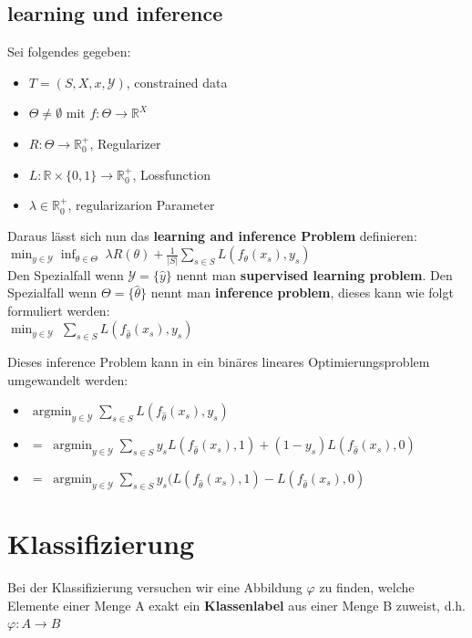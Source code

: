 \documentclass[12pt,a4paper]{article}
\DeclareMathOperator*{\argmin}{argmin}
\newcommand{\nl}{\\[0.1cm]}
\begin{document}
\subsection{learning und inference}
Sei folgendes gegeben:
\begin{itemize}
\item $T=(S,X,x,\mathcal{Y})$, constrained data
\item $\Theta \neq \emptyset$ mit $f: \Theta \rightarrow \mathbb{R}^X$
\item $R: \Theta \rightarrow \mathbb{R}^+_0$, Regularizer
\item $L:\mathbb{R}\times\{0,1\}\rightarrow\mathbb{R}^+_0$, Lossfunction
\item $\lambda\in\mathbb{R}^+_0$, regularizarion Parameter
\end{itemize}
Daraus lässt sich nun das \textbf{learning and inference Problem} definieren:\nl
$\displaystyle \min_{y\in\mathcal{Y}} \inf_{\theta\in\Theta}\; \lambda R(\theta) + \frac{1}{|S|}\sum_{s\in S} L(f_\theta (x_s), y_s)$\nl
Den Spezialfall wenn $\mathcal{Y} = \{\hat{y}\}$ nennt man \textbf{supervised learning problem}. Den Spezialfall wenn $\Theta = \{\hat{\theta}\}$ nennt man \textbf{inference problem}, dieses kann wie folgt formuliert werden:\nl
$\displaystyle \min_{y\in\mathcal{Y}}\; \sum_{s\in S} L(f_{\hat{\theta}} (x_s),y_s)$

Dieses inference Problem kann in ein binäres lineares Optimierungsproblem umgewandelt werden:
\begin{itemize}
\item $\displaystyle \argmin_{y\in\mathcal{Y}} \sum_{s\in S} L(f_{\hat{\theta}} (x_s),y_s)$
\item $\displaystyle = \; \argmin_{y\in\mathcal{Y}} \sum_{s\in S} y_s L(f_{\hat{\theta}} (x_s),1) + (1-y_s) L(f_{\hat{\theta}} (x_s),0)$
\item $\displaystyle = \; \argmin_{y\in\mathcal{Y}} \sum_{s\in S} y_s (L(f_{\hat{\theta}} (x_s),1) - L(f_{\hat{\theta}} (x_s),0)$
\end{itemize}

\section{Klassifizierung}
Bei der Klassifizierung versuchen wir eine Abbildung $\varphi$ zu finden, welche Elemente einer Menge A exakt ein \textbf{Klassenlabel} aus einer Menge B zuweist, d.h. $\varphi: A\rightarrow B$\\
\end{document}
